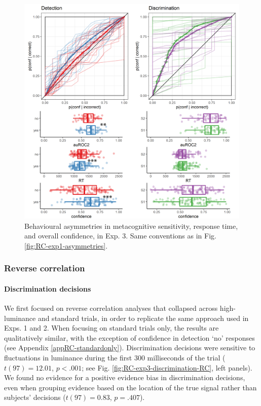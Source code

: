 \documentclass[12pt,twoside]{reedthesis}
\begin{document}
\begin{figure}
\includegraphics[width=\textwidth]{figure/RC/RC-exp3-asymmetries-enhanced} \caption[Behavioural asymmetries in metacognitive sensitivity, response time, and overall confidence, in Exp. 3]{Behavioural asymmetries in metacognitive sensitivity, response time, and overall confidence, in Exp. 3. Same conventions as in Fig. \ref{fig:RC-exp1-asymmetries}.}\label{fig:RC-exp3-asymmetries}
\end{figure}
\hypertarget{reverse-correlation-2}{%
\subsubsection{Reverse correlation}\label{reverse-correlation-2}}

\hypertarget{discrimination-decisions-1}{%
\paragraph*{Discrimination decisions}\label{discrimination-decisions-1}}

We first focused on reverse correlation analyses that collapsed across high-luminance and standard trials, in order to replicate the same approach used in Exps. 1 and 2. When focusing on standard trials only, the results are qualitatively similar, with the exception of confidence in detection `no' responses (see Appendix \ref{appRC-standardonly}). Discrimination decisions were sensitive to fluctuations in luminance during the first 300 milliseconds of the trial (\(t(97) = 12.01\), \(p < .001\); see Fig. \ref{fig:RC-exp3-discrimination-RC}, left panels). We found no evidence for a positive evidence bias in discrimination decisions, even when grouping evidence based on the location of the true signal rather than subjects' decisions (\(t(97) = 0.83\), \(p = .407\)).
\end{document}
